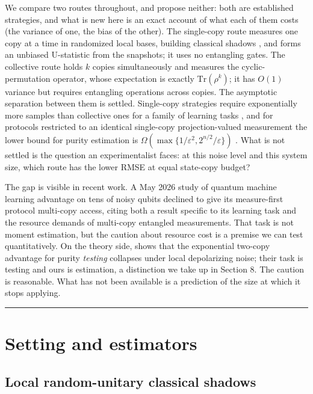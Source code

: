 \documentclass[a4paper,superscriptaddress,nofootinbib,onecolumn,nopdfoutputerror]{quantumarticle}
\begin{document}
We compare two routes throughout, and propose neither: both are established strategies, and what
is new here is an exact account of what each of them costs (the variance of one, the bias of
the other). The single-copy route measures one copy
at a time in randomized local bases, building classical shadows \cite{huang2020shadows}, and forms an unbiased U-statistic
from the snapshots; it uses no entangling gates. The collective route holds \(k\) copies
simultaneously and measures the cyclic-permutation operator, whose expectation is exactly
\(\mathrm{Tr}(\rho^k)\); it has \(O(1)\) variance but requires entangling operations across
copies. The asymptotic separation between them is settled. Single-copy strategies require
exponentially more samples than collective ones for a family of learning tasks
\cite{huang2022advantage,chen2022separations}, and for protocols restricted to an identical
single-copy projection-valued measurement the lower bound for purity estimation is
\(\Omega(\max\{1/\varepsilon^2, 2^{n/2}/\varepsilon\})\) \cite{gong2024purity}. What is not settled
is the question an experimentalist faces: at this noise level and this system size, which route
has the lower RMSE at equal state-copy budget?

The gap is visible in recent work. A May 2026 study of quantum machine learning advantage on tens
of noisy qubits \cite{qmladvantage2026} declined to give its measure-first protocol multi-copy
access, citing both a result specific to its learning task and the resource demands of multi-copy
entangled measurements. That task is not moment estimation, but the caution about resource cost is
a premise we can test quantitatively. On the theory side, \cite{noisylearning2026} shows that the
exponential two-copy advantage for purity \emph{testing} collapses under local depolarizing noise;
their task is testing and ours is estimation, a distinction we take up in Section 8. The caution
is reasonable. What has not been available is a prediction of the size at which it stops applying.

\begin{center}\rule{0.5\linewidth}{0.5pt}\end{center}

\hypertarget{setting-and-estimators}{%
\section{Setting and estimators}\label{setting-and-estimators}}

\hypertarget{local-random-unitary-classical-shadows}{%
\subsection{Local random-unitary classical
shadows}\label{local-random-unitary-classical-shadows}}
\end{document}
